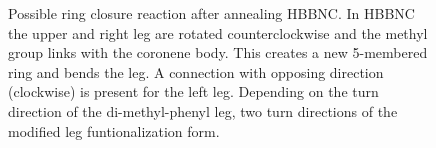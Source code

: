 \begin{figure}[] \centering
	\caption{Possible ring closure reaction after annealing HBBNC.  In HBBNC the upper and right leg are rotated counterclockwise and the methyl group links with the coronene body. This creates a new 5-membered ring and bends the leg. A connection with opposing direction (clockwise) is present for the left leg.  Depending on the turn direction of the di-methyl-phenyl leg, two turn directions of the modified leg funtionalization form. 
	}
	\label{fig:HBBNC-ring-closure}
\end{figure}


